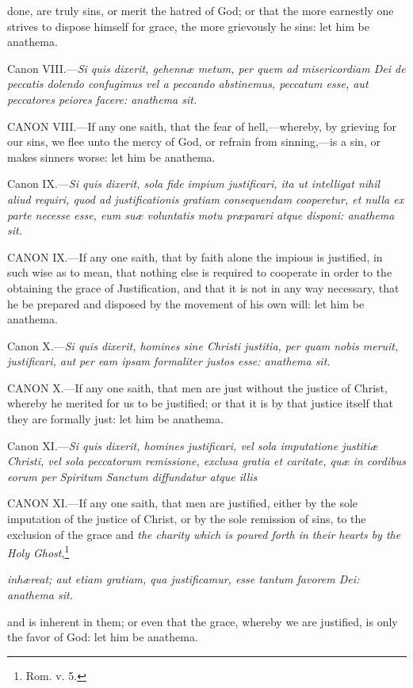 done, are truly sins, or merit the hatred of God; or that the more earnestly one strives to dispose himself for grace, the more grievously he sins: let him be anathema.

Canon VIII.—\emph{Si quis dixerit, gehennæ metum, per quem ad misericordiam Dei de peccatis dolendo confugimus vel a peccando abstinemus, peccatum esse, aut peccatores peiores facere: anathema sit.}

CANON VIII.—If any one saith, that the fear of hell,—whereby, by grieving for our sins, we flee unto the mercy of God, or refrain from sinning,—is a sin, or makes sinners worse: let him be anathema.

Canon IX.—\emph{Si quis dixerit, sola fide impium justificari, ita ut intelligat nihil aliud requiri, quod ad justificationis gratiam consequendam cooperetur, et nulla ex parte necesse esse, eum suæ voluntatis motu præparari atque disponi: anathema sit.}

CANON IX.—If any one saith, that by faith alone the impious is justified, in such wise as to mean, that nothing else is required to cooperate in order to the obtaining the grace of Justification, and that it is not in any way necessary, that he be prepared and disposed by the movement of his own will: let him be anathema.

Canon X.—\emph{Si quis dixerit, homines sine Christi justitia, per quam nobis meruit, justificari, aut per eam ipsam formaliter justos esse: anathema sit.}

CANON X.—If any one saith, that men are just without the justice of Christ, whereby he merited for us to be justified; or that it is by that justice itself that they are formally just: let him be anathema.

Canon XI.—\emph{Si quis dixerit, homines justificari, vel sola imputatione justitiæ Christi, vel sola peccatorum remissione, exclusa gratia et caritate, quæ in cordibus eorum per Spiritum Sanctum diffundatur atque illis}

CANON XI.—If any one saith, that men are justified, either by the sole imputation of the justice of Christ, or by the sole remission of sins, to the exclusion of the grace and \emph{the charity which is poured forth in their hearts by the Holy Ghost},\footnote{\par   Rom. v. 5.}

\emph{inhæreat; aut etiam gratiam, qua justificamur, esse tantum favorem Dei: anathema sit.}

and is inherent in them; or even that the grace, whereby we are justified, is only the favor of God: let him be anathema.

